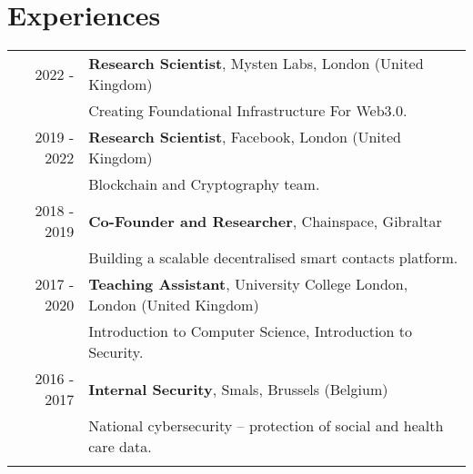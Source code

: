 \documentclass[a4paper,10pt]{article}
\newcommand\tablegap{1ex}
\begin{document}
\section{Experiences}
\begin{tabular}{rp{13cm}}
  2022 -      & \textbf{Research Scientist}, Mysten Labs, London (United Kingdom)                   \\
              & \footnotesize{Creating Foundational Infrastructure For Web3.0.}                     \\
  \addlinespace[\tablegap]

  2019 - 2022 & \textbf{Research Scientist}, Facebook, London (United Kingdom)                      \\
              & \footnotesize{Blockchain and Cryptography team.}                                    \\
  \addlinespace[\tablegap]

  2018 - 2019 & \textbf{Co-Founder and Researcher}, Chainspace, Gibraltar                           \\
              & \footnotesize{Building a scalable decentralised smart contacts platform.}           \\
  \addlinespace[\tablegap]

  2017 - 2020 & \textbf{Teaching Assistant}, University College London, London (United Kingdom)     \\
              & \footnotesize{Introduction to Computer Science, Introduction to Security.}          \\
  \addlinespace[\tablegap]


  2016 - 2017 & \textbf{Internal Security}, Smals, Brussels (Belgium)                               \\
              & \footnotesize{National cybersecurity -- protection of social and health care data.} \\
  \addlinespace[\tablegap]


\end{tabular}
\end{document}
